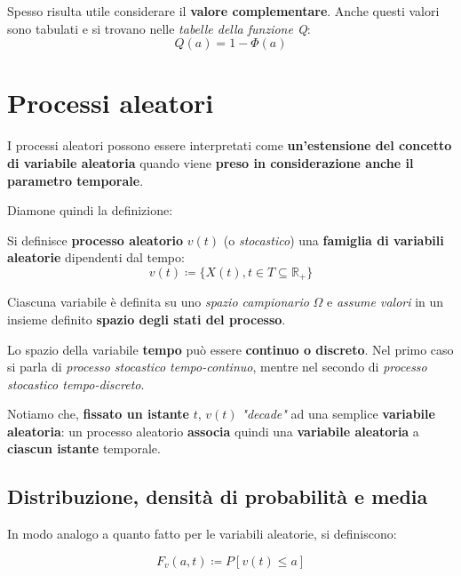 Spesso risulta utile considerare il \textbf{valore complementare}.
Anche questi valori sono tabulati e si trovano nelle \textit{tabelle della funzione Q}:
\[
    Q(a) = 1 - \Phi(a)
\]

\section{Processi aleatori}

I processi aleatori possono essere interpretati come 
\textbf{un'estensione del concetto di variabile aleatoria} 
quando viene \textbf{preso in considerazione anche il parametro temporale}.

Diamone quindi la definizione:

\begin{definition}
    Si definisce \textbf{processo aleatorio} $v(t)$ (o \textit{stocastico}) una
    \textbf{famiglia di variabili aleatorie} dipendenti dal tempo:
    \[
        v(t) \coloneqq  \{X(t), t\in T \subseteq \mathbb{R}_+\}  
    \] 
\end{definition}

Ciascuna variabile è definita su uno \textit{spazio campionario} $\Omega$ e
\textit{assume valori} in un insieme definito \textbf{spazio degli stati del processo}.

Lo spazio della variabile \textbf{tempo} può essere \textbf{continuo o discreto}.
Nel primo caso si parla di \textit{processo stocastico tempo-continuo}, mentre
nel secondo di \textit{processo stocastico tempo-discreto}.

\begin{remark}
    Notiamo che, \textbf{fissato un istante} $t$, $v(t)$
    \textit{"decade"} ad una semplice \textbf{variabile aleatoria}:
    un processo aleatorio \textbf{associa} quindi una
    \textbf{variabile aleatoria} a \textbf{ciascun istante}
    temporale.
\end{remark}

\subsection{Distribuzione, densità di probabilità e media}

In modo analogo a quanto fatto per le variabili aleatorie, si
definiscono:

\begin{definition}
    \[
        F_v (a,t) \coloneqq P[v(t) \le a]
    \] 
\end{definition}

